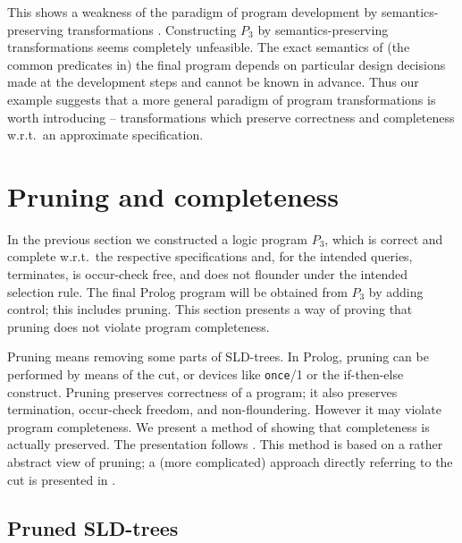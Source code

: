 \documentclass{tlp}
\begin{document}
This shows a weakness of the paradigm of program
development by seman\-tics-preserving transformations
\cite[and the references therein]{PettorossiPS10shorter}.
Constructing $P_3$ by semantics-preserving transformations seems completely
unfeasible. 
The exact semantics of (the common predicates in) the final
program depends on particular design decisions made 
at the development steps and cannot be known in advance.
Thus our example suggests that a more general paradigm of program
transformations is worth introducing -- transformations which
preserve correctness and completeness w.r.t.\ an approximate specification.




\section{Pruning and completeness}
\label{sec:compl-pruning}
In the previous section we constructed a logic program $P_3$,
which is correct and complete w.r.t.\ the respective specifications
and, for the intended queries, terminates, is occur-check free, and does not
flounder under the intended selection rule.
The final Prolog program will be obtained from $P_3$ by adding control;
this includes pruning.
This section presents a way of proving that pruning does not violate
program completeness.

Pruning means removing some parts of SLD-trees.
In Prolog, pruning can be performed by means of the cut, or devices like 
{\tt once}/1 or the if-then-else construct.
Pruning preserves correctness of a program;
it also preserves termination,
occur-check freedom, and non-floundering.
However it may violate program completeness.
We present a method \cite{drabent.tocl16}
of showing that completeness is actually preserved. 
The presentation follows  \cite{drabent.tocl16}.
This method is based on a rather abstract view of pruning; 
a (more complicated) approach
directly referring to the cut is presented in \cite{drabent.faoc16}.


\subsection{Pruned SLD-trees}
\end{document}
